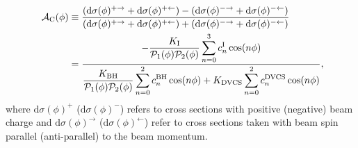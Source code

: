 \begin{align}
\hspace{0.5cm}\mathcal{A}_{\textrm{C}}(\phi) &\equiv  
\frac{(\textrm{d}\sigma(\phi)^{+\rightarrow} +
\textrm{d}\sigma(\phi)^{+\leftarrow}) -
(\textrm{d}\sigma(\phi)^{-\rightarrow}
+ \textrm{d}\sigma(\phi)^{-\leftarrow})}{(\textrm{d}\sigma(\phi)^{+\rightarrow}
+
\textrm{d}\sigma(\phi)^{+\leftarrow}) +
(\textrm{d}\sigma(\phi)^{-\rightarrow}
+ \textrm{d}\sigma(\phi)^{-\leftarrow})}&    \nonumber \\
&=\dfrac{{-\dfrac{K_{\textrm{I}}}{\mathcal{P}_{1}(\phi)\mathcal{P}_{2}(\phi)}
\displaystyle\sum_{n=0}^3
c_{n}^{\textrm{I}}\cos(n\phi)}}{\dfrac{K_{\textrm{BH}}}{\mathcal{P}_{1}
(\phi)\mathcal{P}_
{2}(\phi)}
\displaystyle\sum_{n=0}^2
c_{n}^{\textrm{BH}}\cos(n\phi) + 
K_{\textrm{DVCS}}\displaystyle\sum_{n=0}^2 c_{n}^{\textrm{DVCS}}\cos(n\phi)} ,&
\label{e:ac}
\end{align}
where $\textrm{d}\sigma(\phi)^+$ ($\textrm{d}\sigma(\phi)^-$) refers to
cross sections with positive (negative) beam charge and
$\textrm{d}\sigma(\phi)^\rightarrow$ ($\textrm{d}\sigma(\phi)^\leftarrow$) refer
to cross sections taken with beam spin parallel (anti-parallel) to the
beam momentum.

